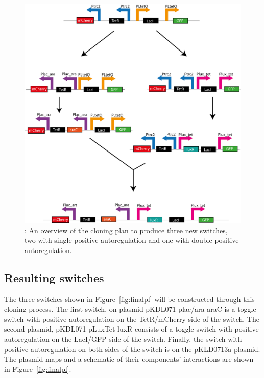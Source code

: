 \begin{figure}[t]
	\begin{center}
		\includegraphics[scale=0.7]{../../chapters/chapterDesignSwitches/images/switches_cloning_big.png}
		\caption[LoF caption]{\label{fig:plan}: An overview of the cloning plan to produce three new switches, two with single positive autoregulation and one with double positive autoregulation.}
	\end{center}
\end{figure}
\clearpage

\subsection{Resulting switches}
The three switches shown in Figure~\ref{fig:finalpl} will be constructed through this cloning process. The first switch, on plasmid pKDL071-plac/ara-araC is a toggle switch with positive autoregulation on the TetR/mCherry side of the switch. The second plasmid, pKDL071-pLuxTet-luxR consists of a toggle switch with positive autoregulation on the LacI/GFP side of the switch. Finally, the switch with positive autoregulation on both sides of the switch is on the pKLD0713a plasmid. The plasmid maps and a schematic of their components' interactions are shown in Figure~\ref{fig:finalpl}. 

